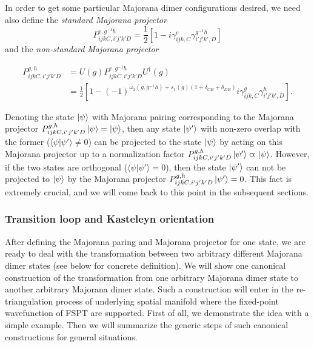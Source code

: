 \documentclass[%
 reprint,
 amsmath,amssymb,
 aps,
prb,
]{revtex4-2}
\begin{document}
In order to get some particular Majorana dimer configurations desired, we need also define the \textit{standard Majorana projector} 
\begin{equation}
P_{ijkC,i'j'k'D}^{e,g^{-1} h} = \frac{1}{2}\left[ 1- i\gamma _{ijk,C}^{e} \gamma _{i'j'k',D}^{g^{-1} h}\right] \label{eq:Majorana projector std}
\end{equation}
and the \textit{non-standard Majorana projector} 
\begin{widetext}
\begin{align} \label{eq:Majorana projector}
P_{ijkC,i'j'k'D}^{g,h} 
&= U( g) P_{ijkC,i'j'k'D}^{e,g^{-1} h} U^{\dagger }( g) \\\nonumber
&= \frac{1}{2}\left[ 1-( -1)^{\omega _{2}\left( g,g^{-1} h\right) +s_{1}( g)( 1+\delta _{CB} +\delta _{DB})} i\gamma _{ijk,C}^{g} \gamma _{i'j'k',D}^{h}\right]. \nonumber
\end{align}
\end{widetext}
Denoting the state $\ket{\psi}$ with Majorana pairing corresponding to the Majorana projector $P_{ijkC,i'j'k'D}^{g,h} \ket{\psi} = \ket{\psi}$, then any state $\ket{\psi'}$ with non-zero overlap with the former ($\langle \psi | \psi' \rangle \neq 0$) can be projected to the state $\ket{\psi}$ by acting on this Majorana projector up to a normalization factor $P_{ijkC,i'j'k'D}^{g,h} \ket{\psi'} \varpropto \ket{\psi}$.
However, if the two states are orthogonal ($\langle \psi | \psi' \rangle = 0$), then the state $\ket{\psi'}$ can not be projected to $\ket{\psi}$ by the Majorana projector $P_{ijkC,i'j'k'D}^{g,h} \ket{\psi'} = 0$.
This fact is extremely crucial, and we will come back to this point in the subsequent sections.

 
\subsubsection{Transition loop and Kasteleyn orientation} \label{sec2.5.2}

After defining the Majorana paring and Majorana projector for one state, we are ready to deal with the transformation between two arbitrary different Majorana dimer states (see below for concrete definition).
We will show one canonical construction of the transformation from one arbitrary Majorana dimer state to another arbitrary Majorana dimer state.
Such a construction will enter in the re-triangulation process of underlying spatial manifold where the fixed-point wavefunction of FSPT are supported.
First of all, we demonstrate the idea with a simple example.
Then we will summarize the generic steps of such canonical constructions for general situations.
\end{document}
